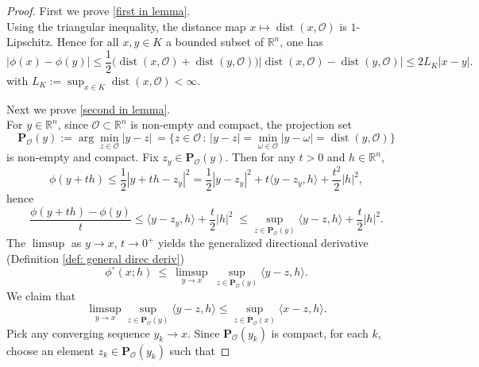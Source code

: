 \documentclass[12pt]{amsart}
\numberwithin{equation}{section}
\theoremstyle{plain}
\begin{document}
\begin{proof}
First we prove \ref{first in lemma}.\\ 
Using the triangular inequality, the distance map $x\mapsto \operatorname{dist}(x,\mathscr{O})$ is $1$-Lipschitz. Hence for all $x, y\in K$ a bounded subset of $\mathbb{R}^{n}$, one has
\begin{equation*}
    |\phi(x)-\phi(y)|\leq \frac{1}{2}\big(\operatorname{dist}(x, \mathscr{O})+\operatorname{dist}(y, \mathscr{O})\big)|\operatorname{dist}(x, \mathscr{O})-\operatorname{dist}(y, \mathscr{O})| \leq 2L_K |x-y| .
\end{equation*}
with $L_K:=\sup _{x \in K} \operatorname{dist}(x,\mathscr{O})<\infty$.


Next we prove \ref{second in lemma}. \\
For $y\in\mathbb{R}^{n}$, since $\mathscr{O}\subset\mathbb{R}^n$ is non-empty and compact,  the projection set 
\begin{equation*}
    \mathbf{P}_{\mathscr{O}}(y):=\arg \min _{z \in \mathscr{O}}|y-z| \, = \{ z\in \mathscr{O}\,:\, |y-z| = \min\limits_{\omega\in \mathscr{O}}|y-\omega|=\operatorname{dist}(y,\mathscr{O}) \}
\end{equation*}
is non-empty and compact. Fix $z_y\in \mathbf{P}_{\mathscr{O}}(y)$.
Then for any $t>0$ and $h\in\mathbb{R}^{n}$, 
\begin{equation*}
    \phi(y+th) \leq \frac12|y+th-z_y|^2
    = \frac12|y-z_y|^2 + t\langle y-z_y,h\rangle + \frac{t^2}{2}|h|^2,
\end{equation*}
hence
\begin{equation*}
    \frac{\phi(y+th)-\phi(y)}{t}\leq \langle y-z_y,h\rangle + \frac{t}{2}|h|^2 \; \leq \sup_{z\in \mathbf{P}_{\mathscr{O}}(y)}\langle y-z,h\rangle + \frac{t}{2}|h|^2.
\end{equation*}
The $\limsup$ as $y\to x$, $t\rightarrow 0^{+}$ yields the generalized directional derivative (Definition \ref{def: general direc deriv})
\begin{equation}\label{eq:clarke-dir}
    \phi^{\circ}(x;h)\ \le\ \limsup_{y\to x}\ \sup_{z\in \mathbf{P}_{\mathscr{O}}(y)}\langle y-z,h\rangle.
\end{equation}
We claim that
\begin{equation}\label{eq:proj}
    \limsup_{y\to x} \sup_{z\in \mathbf{P}_{\mathscr{O}}(y)}\langle y-z,h\rangle
     \leq \sup_{z\in \mathbf{P}_{\mathscr{O}}(x)}\langle x-z,h\rangle.
\end{equation}
Pick any converging sequence $y_k\to x$. Since $\mathbf{P}_{\mathscr{O}}(y_k)$ is compact, for each $k$, choose an element $z_k\in \mathbf{P}_{\mathscr{O}}(y_k)$ such that

\end{proof}
\end{document}
